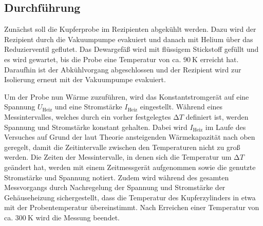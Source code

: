 \subsection{Durchführung}
\label{sec:durchführung}

Zunächst soll die Kupferprobe im Rezipienten abgekühlt werden.
Dazu wird der Rezipient durch die Vakuumpumpe evakuiert und danach mit Helium über das Reduzierventil geflutet.
Das Dewargefäß wird mit flüssigem Stickstoff gefüllt und es wird gewartet, bis die Probe eine Temperatur von ca. $\SI{90}{\kelvin}$ erreicht hat.
Daraufhin ist der Abkühlvorgang abgeschlossen und der Rezipient wird zur Isolierung erneut mit der Vakuumpumpe evakuiert.

Um der Probe nun Wärme zuzuführen, wird das Konstantstromgerät auf eine Spannung $U_{\text{Heiz}}$ und eine Stromstärke $I_{\text{Heiz}}$ eingestellt.
Während eines Messintervalles, welches durch ein vorher festgelegtes $\increment T$ definiert ist, werden Spannung und Stromstärke konstant gehalten.
Dabei wird $I_{\text{Heiz}}$ im Laufe des Versuches auf Grund der laut Theorie ansteigenden Wärmekapazität nach oben geregelt, damit die Zeitintervalle zwischen den Temperaturen nicht zu groß werden.
Die Zeiten der Messintervalle, in denen sich die Temperatur um $\increment T$ geändert hat, werden mit einem Zeitmessgerät aufgenommen sowie die genutzte Stromstärke und Spannung notiert.
Zudem wird während des gesamten Messvorgangs durch Nachregelung der Spannung und Stromstärke der Gehäuseheizung sichergestellt, dass die Temperatur des Kupferzylinders in etwa mit der Probentemperatur übereinstimmt.
Nach Erreichen einer Temperatur von ca. $\SI{300}{\kelvin}$ wird die Messung beendet.
